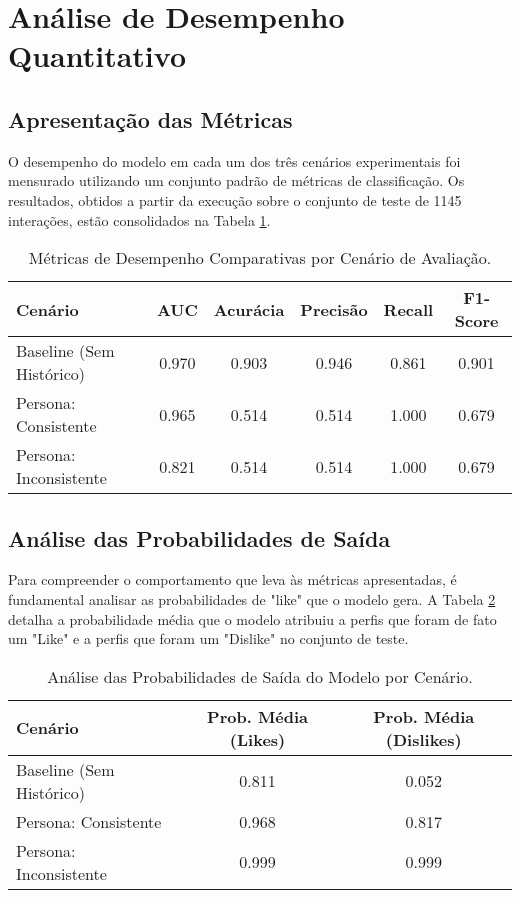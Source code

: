 
\section{Análise de Desempenho Quantitativo}
\label{sec:res_desempenho_quantitativo}

\subsection*{Apresentação das Métricas} %
O desempenho do modelo em cada um dos três cenários experimentais foi mensurado utilizando um conjunto padrão de métricas de classificação. Os resultados, obtidos a partir da execução sobre o conjunto de teste de 1145 interações, estão consolidados na Tabela \ref{tab:metricas_tcc2}.

\begin{table}[H] %
\centering
\caption{Métricas de Desempenho Comparativas por Cenário de Avaliação.}
\label{tab:metricas_tcc2}
\begin{tabular}{lccccc}
\toprule
\textbf{Cenário} & \textbf{AUC} & \textbf{Acurácia} & \textbf{Precisão} & \textbf{Recall} & \textbf{F1-Score} \\
\midrule
Baseline (Sem Histórico) & 0.970 & 0.903 & 0.946 & 0.861 & 0.901 \\
Persona: Consistente     & 0.965 & 0.514 & 0.514 & 1.000 & 0.679 \\
Persona: Inconsistente   & 0.821 & 0.514 & 0.514 & 1.000 & 0.679 \\
\bottomrule
\end{tabular}
\end{table}

\subsection*{Análise das Probabilidades de Saída}
Para compreender o comportamento que leva às métricas apresentadas, é fundamental analisar as probabilidades de "like" que o modelo gera. A Tabela \ref{tab:probabilidades_tcc2} detalha a probabilidade média que o modelo atribuiu a perfis que foram de fato um "Like" e a perfis que foram um "Dislike" no conjunto de teste.

\begin{table}[H] %
\centering
\caption{Análise das Probabilidades de Saída do Modelo por Cenário.}
\label{tab:probabilidades_tcc2}
\begin{tabular}{lcc}
\toprule
\textbf{Cenário} & \textbf{Prob. Média (Likes)} & \textbf{Prob. Média (Dislikes)} \\
\midrule
Baseline (Sem Histórico) & 0.811 & 0.052 \\
Persona: Consistente     & 0.968 & 0.817 \\
Persona: Inconsistente   & 0.999 & 0.999 \\
\bottomrule
\end{tabular}
\end{table}

